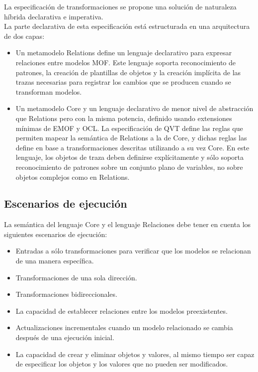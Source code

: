 {La especificación de transformaciones se propone una solución de naturaleza híbrida declarativa e imperativa.\\

La parte declarativa de esta especificación está estructurada en una arquitectura de dos capas:

\begin{itemize}
	\item Un metamodelo Relations define un lenguaje declarativo para expresar relaciones entre modelos MOF. Este lenguaje soporta reconocimiento de patrones, la creación de plantillas de objetos y la creación implícita de las trazas necesarias para registrar los cambios que se producen cuando se transforman modelos.	
	\item Un metamodelo Core y un lenguaje declarativo de menor nivel de abstracción que Relations pero con la misma potencia, definido usando extensiones mínimas de EMOF y OCL. La especificación de QVT define las reglas que permiten mapear la semántica de Relations a la de Core, y dichas reglas las define en base a transformaciones descritas utilizando a su vez Core. En este lenguaje, los objetos de traza deben definirse explícitamente y sólo soporta reconocimiento de patrones sobre un conjunto plano de variables, no sobre objetos complejos como en Relations.
\end{itemize}

\subsection{Escenarios de ejecución}
\label{Escenarios de ejecución}

La semántica del lenguaje Core y el lenguaje Relaciones debe tener en cuenta los siguientes escenarios de ejecución:
\begin{itemize}
	\item Entradas a sólo transformaciones para verificar que los modelos se relacionan de una manera específica.	
	\item Transformaciones de una sola dirección.	
	\item Transformaciones bidireccionales.
	\item La capacidad de establecer relaciones entre los modelos preexistentes.
	\item Actualizaciones incrementales cuando un modelo relacionado se cambia después de una ejecución inicial.
	\item La capacidad de crear y eliminar objetos y valores, al mismo tiempo ser capaz de especificar los objetos y los valores que no pueden ser modificados.
\end{itemize}

}
